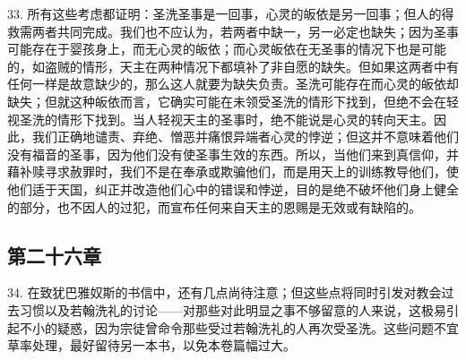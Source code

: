 33. 所有这些考虑都证明：圣洗圣事是一回事，心灵的皈依是另一回事；但人的得救需两者共同完成。我们也不应认为，若两者中缺一，另一必定也缺失；因为圣事可能存在于婴孩身上，而无心灵的皈依；而心灵皈依在无圣事的情况下也是可能的，如盗贼的情形，天主在两种情况下都填补了非自愿的缺失。但如果这两者中有任何一样是故意缺少的，那么这人就要为缺失负责。圣洗可能存在而心灵的皈依却缺失；但就这种皈依而言，它确实可能在未领受圣洗的情形下找到，但绝不会在轻视圣洗的情形下找到。当人轻视天主的圣事时，绝不能说是心灵的转向天主。因此，我们正确地谴责、弃绝、憎恶并痛恨异端者心灵的悖逆；但这并不意味着他们没有福音的圣事，因为他们没有使圣事生效的东西。所以，当他们来到真信仰，并藉补赎寻求赦罪时，我们不是在奉承或欺骗他们，而是用天上的训练教导他们，使他们适于天国，纠正并改造他们心中的错误和悖逆，目的是绝不破坏他们身上健全的部分，也不因人的过犯，而宣布任何来自天主的恩赐是无效或有缺陷的。\par


\subsection{第二十六章}

34. 在致犹巴雅奴斯的书信中，还有几点尚待注意；但这些点将同时引发对教会过去习惯以及若翰洗礼的讨论——对那些对此明显之事不够留意的人来说，这极易引起不小的疑惑，因为宗徒曾命令那些受过若翰洗礼的人再次受圣洗。这些问题不宜草率处理，最好留待另一本书，以免本卷篇幅过大。\par



\section{}

\par


